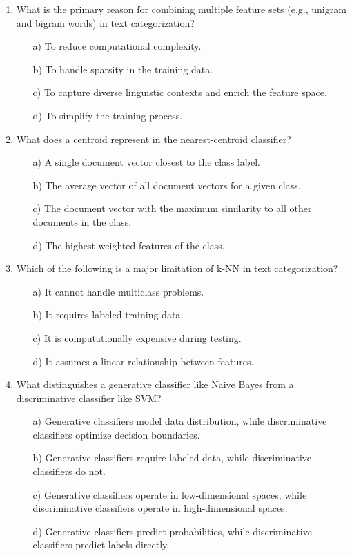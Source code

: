 \documentclass[8pt]{extarticle}
\begin{document}
\begin{multicols}{2}
\begin{enumerate}
\item What is the primary reason for combining multiple feature sets (e.g., unigram and bigram words) in text categorization?
\begin{itemize}
\item[a)] To reduce computational complexity.
\item[b)] To handle sparsity in the training data.
\item[c)] To capture diverse linguistic contexts and enrich the feature space.
\item[d)] To simplify the training process.
\end{itemize}


\item What does a centroid represent in the nearest-centroid classifier?
\begin{itemize}
\item[a)] A single document vector closest to the class label.
\item[b)] The average vector of all document vectors for a given class.
\item[c)] The document vector with the maximum similarity to all other documents in the class.
\item[d)] The highest-weighted features of the class.
\end{itemize}


\item Which of the following is a major limitation of k-NN in text categorization?
\begin{itemize}
\item[a)] It cannot handle multiclass problems.
\item[b)] It requires labeled training data.
\item[c)] It is computationally expensive during testing.
\item[d)] It assumes a linear relationship between features.
\end{itemize}


\item What distinguishes a generative classifier like Naive Bayes from a discriminative classifier like SVM?
\begin{itemize}
\item[a)] Generative classifiers model data distribution, while discriminative classifiers optimize decision boundaries.
\item[b)] Generative classifiers require labeled data, while discriminative classifiers do not.
\item[c)] Generative classifiers operate in low-dimensional spaces, while discriminative classifiers operate in high-dimensional spaces.
\item[d)] Generative classifiers predict probabilities, while discriminative classifiers predict labels directly.
\end{itemize}



\end{enumerate}
\end{multicols}
\end{document}
